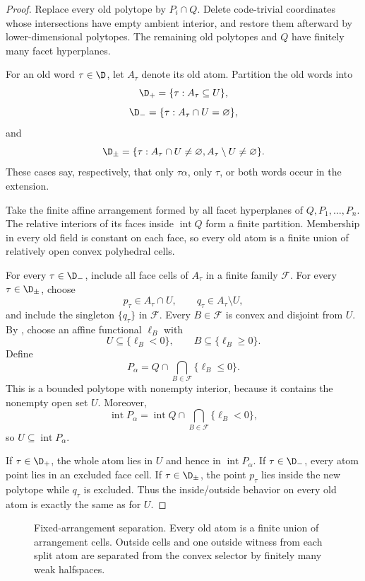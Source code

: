 \begin{proof}
Replace every old polytope by $P_i\cap Q$.  Delete code-trivial coordinates whose intersections have empty ambient interior, and restore them afterward by lower-dimensional polytopes.  The remaining old polytopes and $Q$ have finitely many facet hyperplanes.

For an old word $\tau\in\D$, let $A_\tau$ denote its old atom.  Partition the old words into
\[
 \D_+=\{\tau:A_\tau\subseteq U\},
\]
\[
 \D_-=\{\tau:A_\tau\cap U=\varnothing\},
\]
and
\[
 \D_\pm=\{\tau:A_\tau\cap U\ne\varnothing,
 A_\tau\setminus U\ne\varnothing\}.
\]
These cases say, respectively, that only $\tau\alpha$, only $\tau$, or both words occur in the extension.

Take the finite affine arrangement formed by all facet hyperplanes of $Q,P_1,\ldots,P_n$.  The relative interiors of its faces inside $\operatorname{int}Q$ form a finite partition.  Membership in every old field is constant on each face, so every old atom is a finite union of relatively open convex polyhedral cells.

For every $\tau\in\D_-$, include all face cells of $A_\tau$ in a finite family $\mathcal F$.  For every $\tau\in\D_\pm$, choose
\[
 p_\tau\in A_\tau\cap U,
 \qquad q_\tau\in A_\tau\setminus U,
\]
and include the singleton $\{q_\tau\}$ in $\mathcal F$.  Every $B\in\mathcal F$ is convex and disjoint from $U$.  By , choose an affine functional $\ell_B$ with
\[
 U\subseteq\{\ell_B<0\},
 \qquad B\subseteq\{\ell_B\ge0\}.
\]
Define
\[
 P_\alpha
 =Q\cap\bigcap_{B\in\mathcal F}\{\ell_B\le0\}.
\]
This is a bounded polytope with nonempty interior, because it contains the nonempty open set $U$.  Moreover,
\[
 \operatorname{int}P_\alpha
 =\operatorname{int}Q\cap\bigcap_{B\in\mathcal F}\{\ell_B<0\},
\]
so $U\subseteq\operatorname{int}P_\alpha$.

If $\tau\in\D_+$, the whole atom lies in $U$ and hence in $\operatorname{int}P_\alpha$.  If $\tau\in\D_-$, every atom point lies in an excluded face cell.  If $\tau\in\D_\pm$, the point $p_\tau$ lies inside the new polytope while $q_\tau$ is excluded.  Thus the inside/outside behavior on every old atom is exactly the same as for $U$.
\end{proof}

\begin{figure}[t]
\centering

\caption{Fixed-arrangement separation.  Every old atom is a finite union of arrangement cells.  Outside cells and one outside witness from each split atom are separated from the convex selector by finitely many weak halfspaces.}
\label{fig:fixed-arrangement}
\end{figure}

